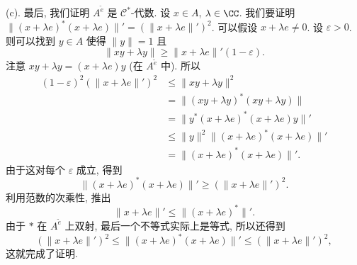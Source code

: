 \begin{solution}
(c). 最后, 我们证明 $A^{\tilde{e}}$ 是 $\mathcal{C}^*$-代数. 设 $x \in A$, $\lambda \in \CC$. 我们要证明 $\|(x + \lambda e)^*(x + \lambda e)\|' = (\|x + \lambda e\|')^2$. 可以假设 $x + \lambda e \neq 0$. 设 $\varepsilon > 0$. 则可以找到 $y \in A$ 使得 $\|y\| = 1$ 且
\[
\|xy + \lambda y\| \geq \|x + \lambda e\|'(1 - \varepsilon).
\]
注意 $xy + \lambda y = (x + \lambda e)y$ (在 $A^{\tilde{e}}$ 中). 所以
\begin{align*}
(1 - \varepsilon)^2(\|x + \lambda e\|')^2 &\leq \|xy + \lambda y\|^2 \\
&= \|(xy + \lambda y)^*(xy + \lambda y)\| \\
&= \|y^*(x + \lambda e)^*(x + \lambda e)y\|' \\
&\leq \|y\|^2\|(x + \lambda e)^*(x + \lambda e)\|' \\
&= \|(x + \lambda e)^*(x + \lambda e)\|'.
\end{align*}
由于这对每个 $\varepsilon$ 成立, 得到
\[
\|(x + \lambda e)^*(x + \lambda e)\|' \geq (\|x + \lambda e\|')^2.
\]
利用范数的次乘性, 推出
\[
\|x + \lambda e\|' \leq \|(x + \lambda e)^*\|'.
\]
由于 $*$ 在 $A^{\tilde{e}}$ 上双射, 最后一个不等式实际上是等式, 所以还得到
\[
(\|x + \lambda e\|')^2 \leq \|(x + \lambda e)^*(x + \lambda e)\|' \leq (\|x + \lambda e\|')^2,
\]
这就完成了证明.
\end{solution}
